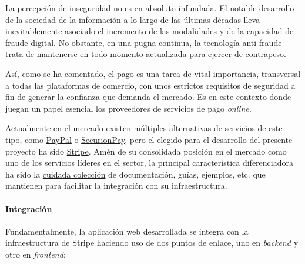 \documentclass[a4paper]{article}
\begin{document}
    La percepción de inseguridad no es en absoluto infundada. El notable desarrollo de la sociedad de la información a lo largo de las últimas décadas lleva inevitablemente asociado el incremento de las modalidades y de la capacidad de fraude digital. No obstante, en una pugna continua, la tecnología anti-fraude trata de mantenerse en todo momento actualizada para ejercer de contrapeso.
    
    Así, como se ha comentado, el pago es una tarea de vital importancia, transversal a todas las plataformas de comercio, con unos estrictos requisitos de seguridad a fin de generar la confianza que demanda el mercado. Es en este contexto donde juegan un papel esencial los proveedores de servicios de pago \emph{online}.
    
    Actualmente en el mercado existen múltiples alternativas de servicios de este tipo, como \href{https://www.paypal.com/}{PayPal} o \href{https://securionpay.com/}{SecurionPay}, pero el elegido para el desarrollo del presente proyecto ha sido \href{https://stripe.com/}{Stripe}. Amén de su consolidada posición en el mercado como uno de los servicios líderes en el sector, la principal característica diferenciadora ha sido la \href{https://stripe.com/docs}{cuidada colección} de documentación, guías, ejemplos, etc. que mantienen para facilitar la integración con su infraestructura. 
    
    \paragraph{Integración}
    Fundamentalmente, la aplicación web desarrollada se integra con la infraestructura de Stripe haciendo uso de dos puntos de enlace, uno en \emph{backend} y otro en \emph{frontend}:
    
\end{document}
